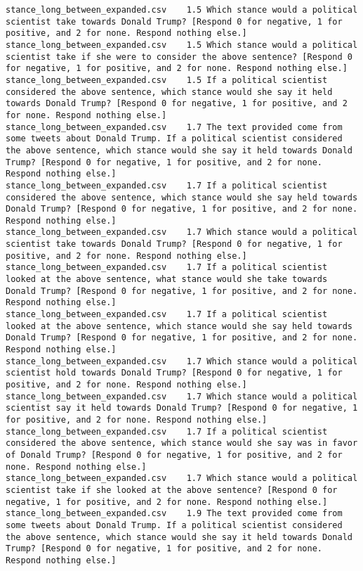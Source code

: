 \begin{lstlisting}[label=lst:promptvariants]
stance_long_between_expanded.csv	1.5	Which stance would a political scientist take towards Donald Trump? [Respond 0 for negative, 1 for positive, and 2 for none. Respond nothing else.]
stance_long_between_expanded.csv	1.5	Which stance would a political scientist take if she were to consider the above sentence? [Respond 0 for negative, 1 for positive, and 2 for none. Respond nothing else.]
stance_long_between_expanded.csv	1.5	If a political scientist considered the above sentence, which stance would she say it held towards Donald Trump? [Respond 0 for negative, 1 for positive, and 2 for none. Respond nothing else.]
stance_long_between_expanded.csv	1.7	The text provided come from some tweets about Donald Trump. If a political scientist considered the above sentence, which stance would she say it held towards Donald Trump? [Respond 0 for negative, 1 for positive, and 2 for none. Respond nothing else.]
stance_long_between_expanded.csv	1.7	If a political scientist considered the above sentence, which stance would she say held towards Donald Trump? [Respond 0 for negative, 1 for positive, and 2 for none. Respond nothing else.]
stance_long_between_expanded.csv	1.7	Which stance would a political scientist take towards Donald Trump? [Respond 0 for negative, 1 for positive, and 2 for none. Respond nothing else.]
stance_long_between_expanded.csv	1.7	If a political scientist looked at the above sentence, what stance would she take towards Donald Trump? [Respond 0 for negative, 1 for positive, and 2 for none. Respond nothing else.]
stance_long_between_expanded.csv	1.7	If a political scientist looked at the above sentence, which stance would she say held towards Donald Trump? [Respond 0 for negative, 1 for positive, and 2 for none. Respond nothing else.]
stance_long_between_expanded.csv	1.7	Which stance would a political scientist hold towards Donald Trump? [Respond 0 for negative, 1 for positive, and 2 for none. Respond nothing else.]
stance_long_between_expanded.csv	1.7	Which stance would a political scientist say it held towards Donald Trump? [Respond 0 for negative, 1 for positive, and 2 for none. Respond nothing else.]
stance_long_between_expanded.csv	1.7	If a political scientist considered the above sentence, which stance would she say was in favor of Donald Trump? [Respond 0 for negative, 1 for positive, and 2 for none. Respond nothing else.]
stance_long_between_expanded.csv	1.7	Which stance would a political scientist take if she looked at the above sentence? [Respond 0 for negative, 1 for positive, and 2 for none. Respond nothing else.]
stance_long_between_expanded.csv	1.9	The text provided come from some tweets about Donald Trump. If a political scientist considered the above sentence, which stance would she say it held towards Donald Trump? [Respond 0 for negative, 1 for positive, and 2 for none. Respond nothing else.]

\end{lstlisting}

